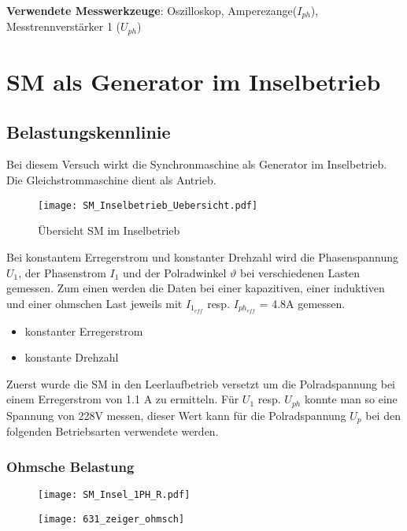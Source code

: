 \begin{flushleft}
\vspace{0.4cm}
\textbf{Verwendete Messwerkzeuge}:  Oszilloskop, Amperezange($I_{ph}$),\\ Messtrennverstärker 1 ($U_{ph}$) 


\newpage
\section{SM als Generator im Inselbetrieb}
\subsection{Belastungskennlinie}
Bei diesem Versuch wirkt die Synchronmaschine als Generator im Inselbetrieb. Die Gleichstrommaschine dient als Antrieb.
\vspace{0.3cm}
\begin{figure}[H]
    \centering
        \texttt{[image: SM\_Inselbetrieb\_Uebersicht.pdf]}
    \caption{Übersicht SM im Inselbetrieb}
    \label{fig:abb1}
\end{figure}
\vspace{0.3cm}
Bei konstantem  Erregerstrom und konstanter Drehzahl wird die Phasenspannung $U_1$, der Phasenstrom $I_1$ und der Polradwinkel $\vartheta$ bei verschiedenen Lasten gemessen. Zum einen werden die Daten bei einer kapazitiven, einer induktiven und einer ohmschen Last jeweils mit $I_{1_{eff}}$ resp. $I_{ph_{eff}}$ = 4.8A gemessen.

\begin{itemize}
\item {}            konstanter Erregerstrom
\item {}				konstante Drehzahl
\end{itemize}
\newpage


Zuerst wurde die SM in den Leerlaufbetrieb versetzt um die Polradspannung bei einem Erregerstrom von 1.1 A zu ermitteln. Für $U_1$ resp. $U_{ph}$ konnte man so eine Spannung von 228V messen, dieser Wert kann für die Polradspannung $U_p$ bei den folgenden Betriebsarten verwendete werden. 

\subsubsection{Ohmsche Belastung}

\begin{figure}[H]
\begin{minipage}[t]{0.45\textwidth}
\centering
\texttt{[image: SM\_Insel\_1PH\_R.pdf]}
\label{fig:abb1}
\end{minipage}
\begin{minipage}[t]{0.4\textwidth}
\centering
\texttt{[image: 631\_zeiger\_ohmsch]}
    \label{fig:abb1}
\end{minipage}
\end{figure}



\end{flushleft}
